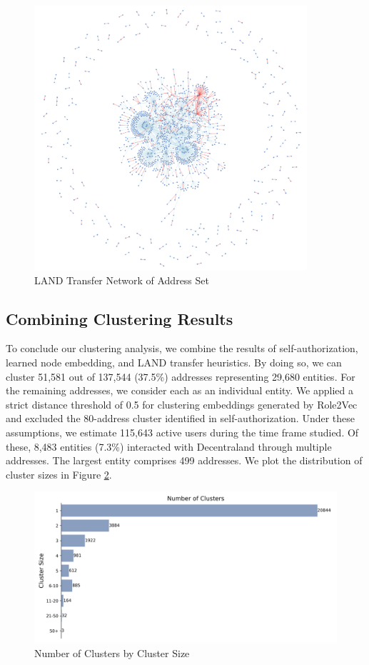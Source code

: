\documentclass[12pt,a4paper,titlepage,oneside,english]{article}
\begin{document}
\begin{figure}[h!]
	\centering
	\includegraphics[width=0.9\textwidth]{./figures/land_network.png}
	\caption{LAND Transfer Network of Address Set}
	\label{fig:LAND_network}
\end{figure} 

\subsection{Combining Clustering Results}
To conclude our clustering analysis, we combine the results of self-authorization, learned node embedding, and LAND transfer heuristics. By doing so, we can cluster 51,581 out of 137,544 (37.5\%) addresses representing 29,680 entities. 
For the remaining addresses, we consider each as an individual entity. 
We applied a strict distance threshold of 0.5 for clustering embeddings generated by Role2Vec and excluded the 80-address cluster identified in self-authorization.
Under these assumptions, we estimate 115,643 active users during the time frame studied. Of these, 8,483 entities (7.3\%) interacted with Decentraland through multiple addresses. The largest entity comprises 499 addresses. We plot the distribution of cluster sizes in Figure \ref{fig:barplot_clusters}.

\begin{figure}[h]
	\centering
	\includegraphics[width=\textwidth]{./figures/cluster-size-distribution.png}
	\caption{Number of Clusters by Cluster Size}
	\label{fig:barplot_clusters}
\end{figure}
\end{document}
